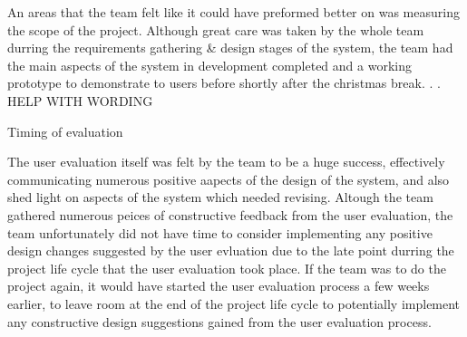 An areas that the team felt like it could have preformed better on was measuring the scope of the project. Although great care was taken by the whole team durring the requirements gathering \& design stages of the system, the  team had the main aspects of the system in development completed and a working prototype to demonstrate to users before shortly after the christmas break. . . HELP WITH WORDING


Timing of evaluation 

The user evaluation itself was felt by the team to be a huge success, effectively communicating numerous positive aapects of the design of the system, and also shed light on aspects of the system which needed revising. Altough the team gathered numerous peices of constructive feedback from the user evaluation, the team unfortunately did not have time to consider implementing any positive design changes suggested by the user evluation due to the late point durring the project life cycle that the user evaluation took place. If the team was to do the project again, it would have started the user evaluation process a few weeks earlier, to leave room at the end of the project life cycle to potentially implement any constructive design suggestions gained from the user evaluation process.       

    


